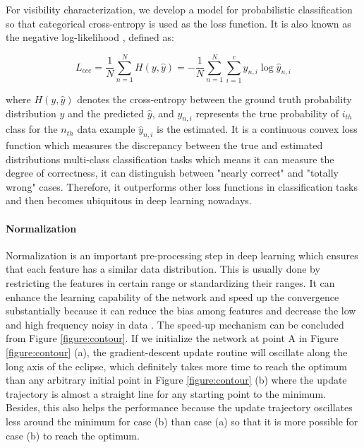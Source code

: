 For visibility characterization, we develop a model for probabilistic classification so that categorical cross-entropy is used as the loss function. It is also known as the negative log-likelihood \cite{Goodfellow-et-al-2016}, defined as:

\begin{equation}
\label{eq11}
L_{cce} =\frac{1}{N} \sum_{n=1}^N H(y,\widehat{y}) = -\frac{1}{N}\sum_{n=1}^N \sum_{i=1}^c y_{n,i} \log \widehat{y}_{n,i}
\end{equation}

where $H(y, \widehat{y})$ denotes the cross-entropy between the ground truth probability distribution $y$ and the predicted $\widehat{y}$, and $y_{n,i} $ represents the true probability of $i_{th}$ class for the $n_{th}$ data example $\widehat{y}_{n,i}$ is the estimated. It is a continuous convex loss function which measures the discrepancy between the true and estimated distributions multi-class classification tasks \cite{DBLP:journals/corr/abs-1802-09941} which means it can measure the degree of correctness, \ie it can distinguish between "nearly correct" and "totally wrong" cases.  Therefore, it outperforms other loss functions in classification tasks and then becomes ubiquitous in deep learning nowadays.


\paragraph{Normalization}
Normalization is an important pre-processing step in deep learning which ensures that each feature has a similar data distribution. This is usually done by restricting the features in certain range or standardizing their ranges. It can enhance the learning capability of the network and speed up the convergence substantially  because it can reduce the bias among features and decrease the low and high frequency noisy in data \cite{Jayalakshmi2011}. The speed-up mechanism can be concluded from Figure \ref{figure:contour}. If we initialize the network at point A in Figure \ref{figure:contour} (a), the gradient-descent update routine will oscillate along the long axis of the eclipse, which definitely takes more time to reach the optimum than any arbitrary initial point in Figure \ref{figure:contour} (b) where the update trajectory is almost a straight line for any starting point  to the minimum. Besides, this also helps the performance because the update trajectory oscillates less around the minimum for case (b) than case (a) so that it is more possible for case (b) to reach the optimum.

